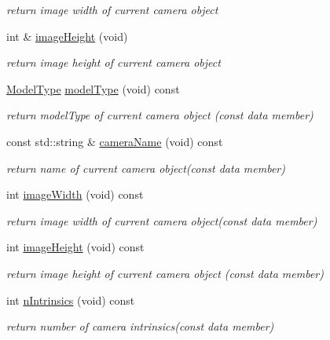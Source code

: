 \begin{DoxyCompactItemize}
\begin{DoxyCompactList}\small\item\em return image width of current camera object \end{DoxyCompactList}\item 
int \& \hyperlink{classcamodocal_1_1Camera_1_1Parameters_a2dcff4a5472ebc79d5d72762681220a3}{image\+Height} (void)
\begin{DoxyCompactList}\small\item\em return image height of current camera object \end{DoxyCompactList}\item 
\hyperlink{classcamodocal_1_1Camera_a663bb19b7b1f38f6d1b7eeb0890183ff}{Model\+Type} \hyperlink{classcamodocal_1_1Camera_1_1Parameters_a6e4cf944dfed64a4204ee7b7609af2f7}{model\+Type} (void) const
\begin{DoxyCompactList}\small\item\em return model\+Type of current camera object (const data member) \end{DoxyCompactList}\item 
const std\+::string \& \hyperlink{classcamodocal_1_1Camera_1_1Parameters_ab1ca64ed9b9555a802c2e25c7148744b}{camera\+Name} (void) const
\begin{DoxyCompactList}\small\item\em return name of current camera object(const data member) \end{DoxyCompactList}\item 
int \hyperlink{classcamodocal_1_1Camera_1_1Parameters_ad18cfb16816d1385f7e9494056bcb508}{image\+Width} (void) const
\begin{DoxyCompactList}\small\item\em return image width of current camera object(const data member) \end{DoxyCompactList}\item 
int \hyperlink{classcamodocal_1_1Camera_1_1Parameters_a2b41722deff54c1e34de59892ab604a2}{image\+Height} (void) const
\begin{DoxyCompactList}\small\item\em return image height of current camera object (const data member) \end{DoxyCompactList}\item 
int \hyperlink{classcamodocal_1_1Camera_1_1Parameters_aa31b8ba0c96f14452fe61613ec8f50fa}{n\+Intrinsics} (void) const
\begin{DoxyCompactList}\small\item\em return number of camera intrinsics(const data member) \end{DoxyCompactList}\item 

\end{DoxyCompactItemize}
